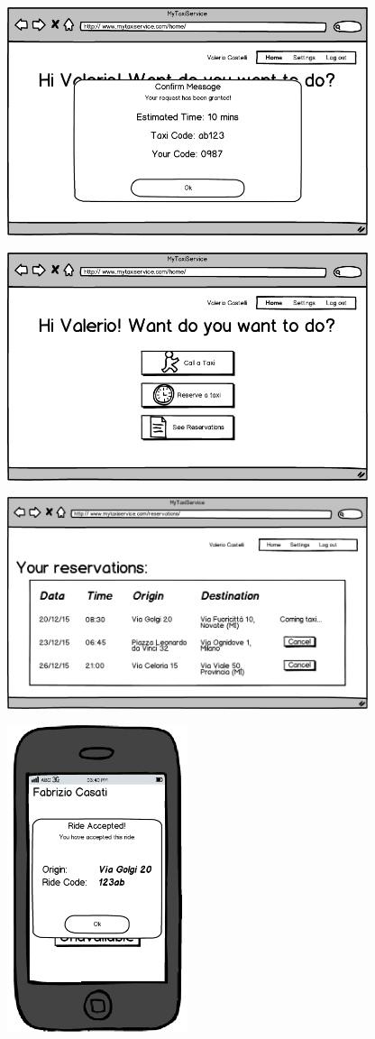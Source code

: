 \begin{center}
\includegraphics[width=300pt,keepaspectratio]{images/user_confirm.png}

\includegraphics[width=300pt,keepaspectratio]{images/user_home.png}

\includegraphics[width=300pt,keepaspectratio]{images/user_reservation.png}

\includegraphics[width=150pt,keepaspectratio]{images/taxi_accepted_ride.png}


\end{center}
